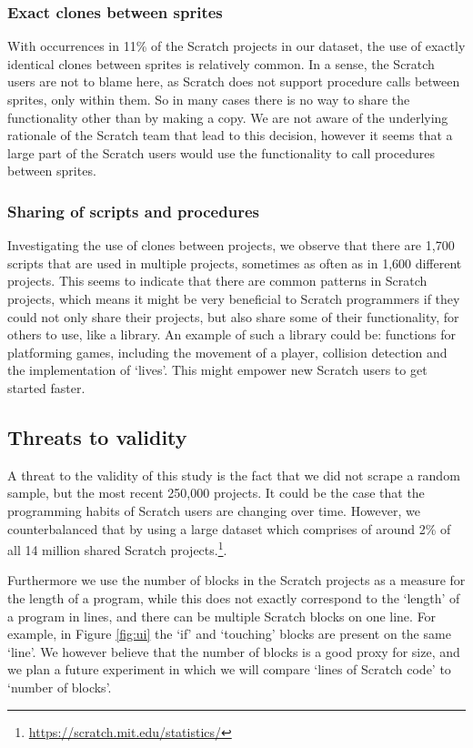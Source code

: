 \documentclass{sig-alternate}
\begin{document}
\subsubsection{Exact clones between sprites}
With occurrences in 11\% of the Scratch projects in our dataset, the use of exactly identical clones between sprites is relatively common. In a sense, the Scratch users are not to blame here, as Scratch does not support procedure calls between sprites, only within them. So in many cases there is no way to share the functionality other than by making a copy. We are not aware of the underlying rationale of the Scratch team that lead to this decision, however it seems that a large part of the Scratch users would use the functionality to call procedures between sprites.

\subsubsection{Sharing of scripts and procedures}
Investigating the use of clones between projects, we observe that there are 1,700 scripts that are used in multiple projects, sometimes as often as in 1,600 different projects. This seems to indicate that there are common patterns in Scratch projects, which means it might be very beneficial to Scratch programmers if they could not only share their projects, but also share some of their functionality, for others to use, like a library. An example of such a library could be: functions for platforming games, including the movement of a player, collision detection and the implementation of `lives'. This might empower new Scratch users to get started faster.

\subsection{Threats to validity}
A threat to the validity of this study is the fact that we did not scrape a random sample, but the most recent 250,000 projects. It could be the case that the programming habits of Scratch users are changing over time. However, we counterbalanced that by using a large dataset which comprises of around 2\% of all 14 million shared Scratch projects.\footnote{\url{https://scratch.mit.edu/statistics/}}.

Furthermore we use the number of blocks in the Scratch projects as a measure for the length of a program, while this does not exactly correspond to the `length' of a program in lines, and there can be multiple Scratch blocks on one line. For example, in Figure \ref{fig:ui} the `if' and `touching' blocks are present on the same `line'. We however believe that the number of blocks is a good proxy for size, and we plan a future experiment in which we will compare `lines of Scratch code' to `number of blocks'.
\end{document}
